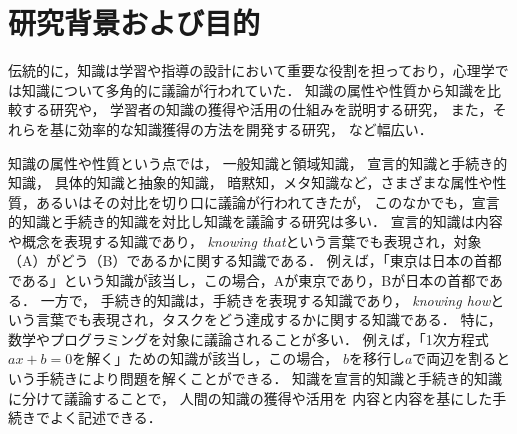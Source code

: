 \documentclass[twocolumn,a4j,10pt]{jsarticle}
\begin{document}


\normalsize

\renewcommand{\baselinestretch}{1} 
 
\section{研究背景および目的}
伝統的に，知識は学習や指導の設計において重要な役割を担っており，心理学では知識について多角的に議論が行われていた．
知識の属性や性質から知識を比較する研究や，
学習者の知識の獲得や活用の仕組みを説明する研究，
また，それらを基に効率的な知識獲得の方法を開発する研究，
など幅広い．


知識の属性や性質という点では，
一般知識と領域知識，
宣言的知識と手続き的知識，
具体的知識と抽象的知識，
暗黙知，メタ知識など，さまざまな属性や性質，あるいはその対比を切り口に議論が行われてきたが，
このなかでも，宣言的知識と手続き的知識を対比し知識を議論する研究は多い．
宣言的知識は内容や概念を表現する知識であり，
{\it knowing that}という言葉でも表現され，対象（A）がどう（B）であるかに関する知識である．
例えば，「東京は日本の首都である」という知識が該当し，この場合，Aが東京であり，Bが日本の首都である．
一方で，
手続き的知識は，手続きを表現する知識であり，
{\it knowing how}という言葉でも表現され，タスクをどう達成するかに関する知識である．
特に，数学やプログラミングを対象に議論されることが多い．
例えば，「1次方程式$ax + b = 0$を解く」ための知識が該当し，この場合，
$b$を移行し$a$で両辺を割るという手続きにより問題を解くことができる．
知識を宣言的知識と手続き的知識に分けて議論することで，
人間の知識の獲得や活用を
内容と内容を基にした手続きでよく記述できる．
\end{document}
